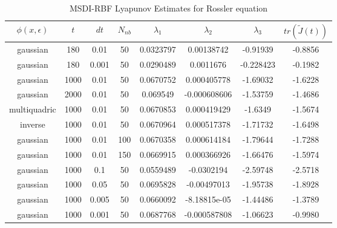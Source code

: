             \begin{table}
                \centering
                \begin{tabular}[h]{||c c c c c c c c||}
                    \hline
                    $\phi (x,\epsilon)$ & $t$ & $dt$ & $N_{nb}$ & $\lambda_1$ & $\lambda_2$ & $\lambda_3$ & $tr(\tilde{J}(t))$\\
                    \hline
                    gaussian & 180 & 0.01 & 50 & 0.0323797 & 0.00138742  &  -0.91939 & -0.8856\\
                    \hline
                    gaussian & 180 & 0.001 & 50 & 0.0290489 & 0.0011676 & -0.228423 & -0.1982\\
                    \hline
                    gaussian & 1000 & 0.01 & 50 & 0.0670752 & 0.000405778 &-1.69032 & -1.6228\\
                    \hline
                    gaussian & 2000 & 0.01 & 50 & 0.069549 & -0.000608606 &   -1.53759 & -1.4686\\
                    \hline
                    multiquadric & 1000 & 0.01 & 50 & 0.0670853 & 0.000419429 &   -1.6349 & -1.5674\\
                    \hline
                    inverse & 1000 & 0.01 & 50 & 0.0670964 & 0.000517378  &  -1.71732 & -1.6498\\
                    \hline
                    gaussian & 1000 & 0.01 & 100 & 0.0670358 & 0.000614184  &  -1.79644 & -1.7288\\
                    \hline
                    gaussian & 1000 & 0.01 & 150 & 0.0669915 & 0.000366926  &  -1.66476 & -1.5974\\
                    \hline
                    gaussian & 1000 & 0.1 & 50 & 0.0559489 & -0.0302194  &  -2.59748 & -2.5718\\
                    \hline
                    gaussian & 1000 & 0.05 & 50 & 0.0695828 & -0.00497013   & -1.95738 & -1.8928\\
                    \hline
                    gaussian & 1000 & 0.005 & 50 & 0.0660092 & -8.18815e-05  &  -1.44486 & -1.3789\\
                    \hline
                    gaussian & 1000 & 0.001 & 50 & 0.0687768 & -0.000587808  &  -1.06623 & -0.9980\\ [1ex]
                    \hline
                \end{tabular}\\
                \caption{MSDI-RBF Lyapunov Estimates for Rossler equation}\label{table:rosslerest}
            \end{table}

